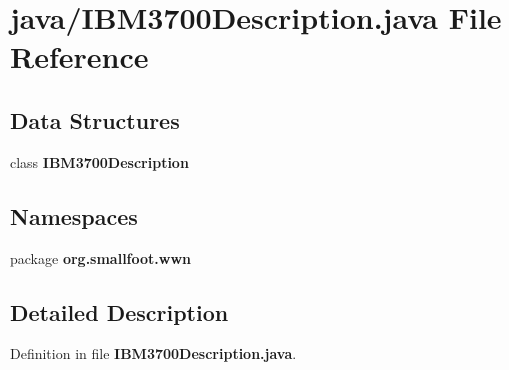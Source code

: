 \section{java/\-I\-B\-M3700\-Description.java \-File \-Reference}
\label{IBM3700Description_8java}
\subsection*{\-Data \-Structures}
\begin{DoxyCompactItemize}
\item 
class {\bf \-I\-B\-M3700\-Description}
\end{DoxyCompactItemize}
\subsection*{\-Namespaces}
\begin{DoxyCompactItemize}
\item 
package {\bf org.\-smallfoot.\-wwn}
\end{DoxyCompactItemize}


\subsection{\-Detailed \-Description}


\-Definition in file {\bf \-I\-B\-M3700\-Description.\-java}.

